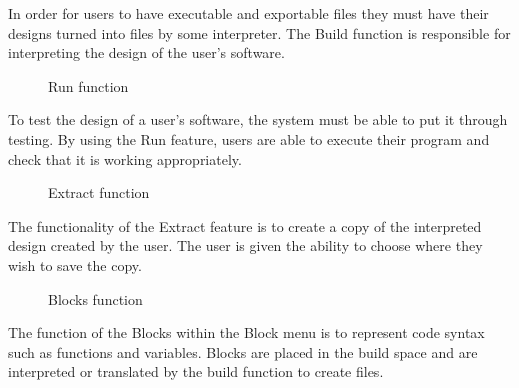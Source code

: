 \documentclass[journal,10pt,onecolumn,compsoc]{IEEEtran} \usepackage[margin=1.0in]{geometry} \usepackage{pdfpages}
\begin{document}
In order for users to have executable and exportable files they must have their designs turned into files by some interpreter.
The Build function is responsible for interpreting the design of the user's software.

\begin{figure}[H]
\centering
{}
\caption{Run function}
\end{figure}

\noindent To test the design of a user's software, the system must be able to put it through testing.
By using the Run feature, users are able to execute their program and check that it is working appropriately.

\begin{figure}[H]
\centering
{}
\caption{Extract function}
\end{figure}

\noindent The functionality of the Extract feature is to create a copy of the interpreted design created by the user. 
The user is given the ability to choose where they wish to save the copy.

\begin{figure}[H]
\centering
{}
\caption{Blocks function}
\end{figure}

\noindent The function of the Blocks within the Block menu is to represent code syntax such as functions and variables.
Blocks are placed in the build space and are interpreted or translated by the build function to create files.
\end{document}
